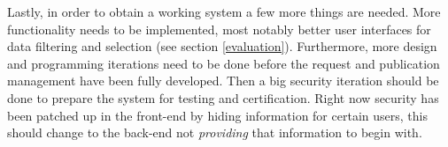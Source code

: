 Lastly, in order to obtain a working system a few more things are needed.
More functionality needs to be implemented, most notably better user interfaces for data filtering and selection (see section \ref{evaluation}).
Furthermore, more design and programming iterations need to be done before the request and publication management have been fully developed.
Then a big security iteration should be done to prepare the system for testing and certification.
Right now security has been patched up in the front-end by hiding information for certain users, this should change to the back-end not \emph{providing} that information to begin with.

